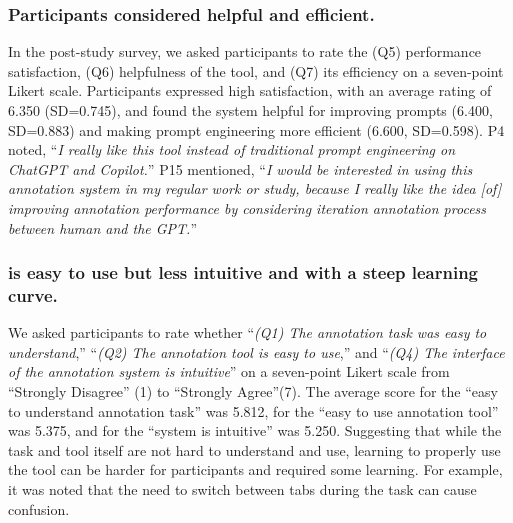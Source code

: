 \subsubsection{Participants considered \system helpful and efficient.}
In the post-study survey, we asked participants to rate the (Q5) performance satisfaction, (Q6) helpfulness of the tool, and (Q7) its efficiency on a seven-point Likert scale.
Participants expressed high satisfaction, with an average rating of 6.350 (SD=0.745), and found the system helpful for improving prompts (6.400, SD=0.883) and making prompt engineering more efficient (6.600, SD=0.598).
P4 noted, ``\textit{I really like this tool instead of traditional prompt engineering on ChatGPT and Copilot.}''
P15 mentioned, ``\textit{I would be interested in using this annotation system in my regular work or study, because I really like the idea [of] improving annotation performance by considering iteration annotation process between human and the GPT.}''



\subsubsection{\system is easy to use but less intuitive and with a steep learning curve.}
We asked participants to rate whether ``\textit{(Q1) The annotation task was easy to understand},'' ``\textit{(Q2) The annotation tool is easy to use},'' and ``\textit{(Q4) The interface of the annotation system is intuitive}'' on a seven-point Likert scale from ``Strongly Disagree'' (1) to ``Strongly Agree''(7). 
The average score for the ``easy to understand annotation task'' was 5.812, for the ``easy to use annotation tool'' was 5.375, and for the ``system is intuitive'' was 5.250. Suggesting that while the task and tool itself are not hard to understand and use, learning to properly use the tool can be harder for participants and required some learning.
For example, it was noted that the need to switch between tabs during the task can cause confusion.



